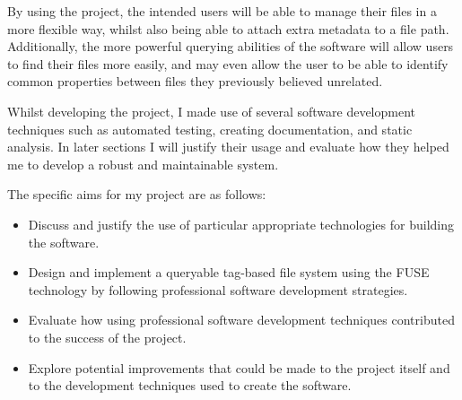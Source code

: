 By using the project, the intended users will be able to manage their files in
a more flexible way, whilst also being able to attach extra metadata to a file
path. Additionally, the more powerful querying abilities of the software will
allow users to find their files more easily, and may even allow the user to
be able to identify common properties between files they previously believed
unrelated.

Whilst developing the project, I made use of several software development
techniques such as automated testing, creating documentation, and static
analysis. In later sections I will justify their usage and evaluate how they
helped me to develop a robust and maintainable system.

\vspace{4mm}
The specific aims for my project are as follows:
\begin{itemize}
    \item Discuss and justify the use of particular appropriate technologies
        for building the software.
    \item Design and implement a queryable tag-based file system using the FUSE
        technology by following professional software development strategies.
    \item Evaluate how using professional software development techniques
        contributed to the success of the project.
    \item Explore potential improvements that could be made to the project
        itself and to the development techniques used to create the software.
\end{itemize}
